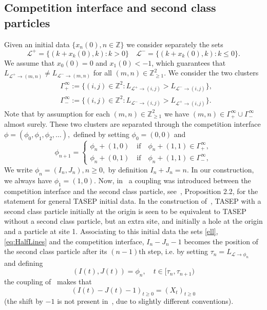 \documentclass[12pt,a4paper]{article}
\numberwithin{equation}{section}
\newcommand{\Z}{\mathbb{Z}}
\begin{document}
\subsection{Competition interface and second class particles}
Given an initial data $\{x_{n}(0),n \in \Z\}$ we consider separately the sets
\begin{equation}\label{eq:HalfLines}
\mathcal{L}^{+}=\{(k+x_{k}(0),k):k>0\} \quad \mathcal{L}^{-}=\{(k+x_{k}(0),k):k\leq 0\}.
\end{equation}
We assume that
$x_{0}(0)=0$ and $x_{1}(0)<-1$, which guarantees that $L_{\mathcal{L}^{+}\to (m,n)}\neq L_{\mathcal{L}^{-}\to (m,n)}$ for all $(m,n) \in \Z_{\geq 1}^{2}.$ We consider the two clusters
\begin{equation}
\begin{aligned}
&\Gamma_{+}^{\infty}:=\{(i,j)\in \Z^{2}:L_{\mathcal{L}^{+}\to (i,j)}>L_{\mathcal{L}^{-}\to (i,j)}\},\\
& \Gamma_{-}^{\infty}:=\{(i,j)\in \Z^{2}:L_{\mathcal{L}^{-}\to (i,j)}>L_{\mathcal{L}^{+}\to (i,j)}\}.
\end{aligned}
\end{equation}
Note that by assumption for each $(m,n)\in \Z_{\geq 1}^{2}$ we have $(m,n) \in \Gamma_{+}^{\infty}\cup \Gamma_{-}^{\infty}$ almost surely.
These two clusters are separated through the competition interface $\phi=(\phi_0,\phi_1,\phi_2,\ldots),$ defined by setting $\phi_0 =(0,0)$ and
\begin{equation}\label{compint}
 \phi_{n+1}=\begin{cases}
 \phi_{n}+(1,0) \quad \mathrm{ if }\quad \phi_{n}+(1,1) \in \Gamma_{+}^{\infty},\\
 \phi_{n}+(0,1) \quad \mathrm{ if }\quad \phi_{n}+(1,1) \in \Gamma_{-}^{\infty},
 \end{cases}
\end{equation}
We write $\phi_{n}=(I_n,J_n),n \geq 0,$ by definition $I_n + J_n=n$. In our construction, we always have $\phi_1 =(1,0)$.
Now, in~\cite{FP05B} a coupling was introduced between the competition interface and the second class particle, see~\cite{FMP09}, Proposition 2.2, for the statement for general TASEP initial data. In the construction of~\cite{FMP09}, TASEP with a second class particle initially at the origin is seen to be equivalent to TASEP without a second class particle, but an extra site, and initially a hole at the origin and a particle at site 1. Associating to this initial data the sets \eqref{ell}, \eqref{eq:HalfLines} and the competition interface, $I_n - J_n -1$ becomes the position of the second class particle after its $(n-1)\mathrm{th}$ step, i.e. by setting $\tau_{n}=L_{\mathcal{L} \to \phi_n}$ and defining
\begin{equation}
(I(t),J(t))=\phi_n ,\quad t \in [\tau_n, \tau_{n+1})
\end{equation}
the coupling of~\cite{FMP09} makes that
\begin{equation}\label{eq:Corr2ndComp}
(I(t)-J(t)-1)_{t \geq 0} = (X_t)_{t \geq 0}
\end{equation}
 (the shift by $-1$ is not present in~\cite{FMP09}, due to slightly different conventions).
\end{document}
